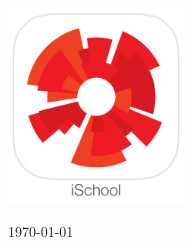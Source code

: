 \begin{titlepage}
\begin{center}
\includegraphics[width=0.35\textwidth]{AppIcon.jpg}~\\[1cm]

\vfill

{\large \today}

\end{center}
\end{titlepage}